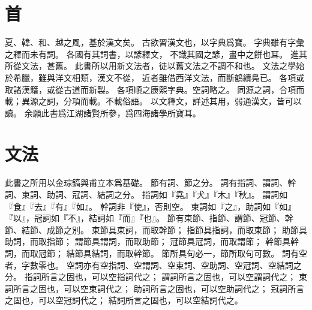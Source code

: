 \chapter*{首}
夏、韓、和、越之風，基於漢文矣。
古欲習漢文也，以字典爲寶。
字典雖有字彙之釋而未有詞。
各國有其詞書，以諺釋文，
不識其國之諺，畫中之餅也耳。
進其所從文法，甚舊。
此書所以用新文法者，徒以舊文法之不調不和也。
文法之學始於希臘，雖與洋文相類，漢文不從，
近者雖借西洋文法，而斷鶴續鳧已\parencite{Ahn:2012}。
各項或取諸漢籍，或從古道而新製。
各項順之康熙字典。空詞略之。
同源之詞，合項而載；異源之詞，分項而載。不載俗語。
以文釋文，詳述其用，弱通漢文，皆可以讀。
余願此書爲江湖諸賢所參，爲四海諸學所寶耳。
\chapter*{文法}
此書之所用以金琮鎬與甫立本爲基礎。
節有詞、節之分。
詞有指詞、謂詞、幹詞、束詞、助詞、冠詞、結詞之分\parencites[43-4]{Pulleyblank:2005}[2-35]{Kim:2019}。
指詞如『堯』『犬』『木』『秋』。
謂詞如『食』『去』『有』『如』。
幹詞非『使』，否則空。
束詞如『之』，助詞如『如』『以』，冠詞如『不』，結詞如『而』『也』。
節有束節、指節、謂節、冠節、幹節、結節、成節之別\parencite[15]{Kim:2019}。
束節具束詞，而取幹節；
指節具指詞，而取束節；
助節具助詞，而取指節；
謂節具謂詞，而取助節；
冠節具冠詞，而取謂節；
幹節具幹詞，而取冠節；
結節具結詞，而取幹節。
節所具句必一，節所取句可數。
詞有空者，字數零也\parencite[2]{Kim:2019}。
空詞亦有空指詞、空謂詞、空束詞、空助詞、空冠詞、空結詞之分。
指詞所言之固也，可以空指詞代之；
謂詞所言之固也，可以空謂詞代之；
束詞所言之固也，可以空束詞代之；
助詞所言之固也，可以空助詞代之；
冠詞所言之固也，可以空冠詞代之；
結詞所言之固也，可以空結詞代之。
